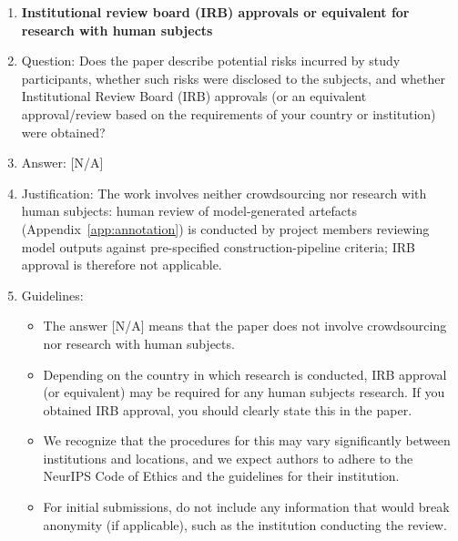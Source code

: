 \documentclass{llmxive}
\providecommand{\answerNA}[1][]{[N/A]#1}
\begin{document}
\begin{enumerate}
\item {\bf Institutional review board (IRB) approvals or equivalent for research with human subjects}
    \item[] Question: Does the paper describe potential risks incurred by study participants, whether such risks were disclosed to the subjects, and whether Institutional Review Board (IRB) approvals (or an equivalent approval/review based on the requirements of your country or institution) were obtained?
    \item[] Answer: \answerNA{}
    \item[] Justification: The work involves neither crowdsourcing nor research with human subjects: human review of model-generated artefacts (Appendix~\ref{app:annotation}) is conducted by project members reviewing model outputs against pre-specified construction-pipeline criteria; IRB approval is therefore not applicable.
    \item[] Guidelines:
    \begin{itemize}
        \item The answer \answerNA{} means that the paper does not involve crowdsourcing nor research with human subjects.
        \item Depending on the country in which research is conducted, IRB approval (or equivalent) may be required for any human subjects research. If you obtained IRB approval, you should clearly state this in the paper.
        \item We recognize that the procedures for this may vary significantly between institutions and locations, and we expect authors to adhere to the NeurIPS Code of Ethics and the guidelines for their institution.
        \item For initial submissions, do not include any information that would break anonymity (if applicable), such as the institution conducting the review.
    \end{itemize}


\end{enumerate}
\end{document}
